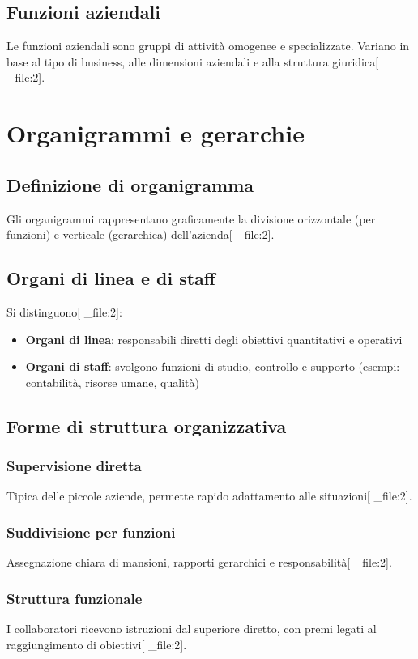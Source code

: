 \documentclass[12pt,a4paper]{article}
\begin{document}
\subsection{Funzioni aziendali}
Le funzioni aziendali sono gruppi di attività omogenee e specializzate. Variano in base al tipo di business, alle dimensioni aziendali e alla struttura giuridica[ _file:2].

\section{Organigrammi e gerarchie}

\subsection{Definizione di organigramma}
Gli organigrammi rappresentano graficamente la divisione orizzontale (per funzioni) e verticale (gerarchica) dell'azienda[ _file:2].

\subsection{Organi di linea e di staff}
Si distinguono[ _file:2]:
\begin{itemize}
    \item \textbf{Organi di linea}: responsabili diretti degli obiettivi quantitativi e operativi
    \item \textbf{Organi di staff}: svolgono funzioni di studio, controllo e supporto (esempi: contabilità, risorse umane, qualità)
\end{itemize}

\subsection{Forme di struttura organizzativa}

\subsubsection{Supervisione diretta}
Tipica delle piccole aziende, permette rapido adattamento alle situazioni[ _file:2].

\subsubsection{Suddivisione per funzioni}
Assegnazione chiara di mansioni, rapporti gerarchici e responsabilità[ _file:2].

\subsubsection{Struttura funzionale}
I collaboratori ricevono istruzioni dal superiore diretto, con premi legati al raggiungimento di obiettivi[ _file:2].
\end{document}
